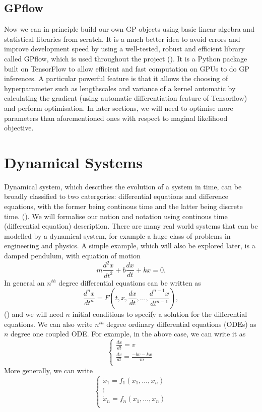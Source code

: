 \documentclass{statsmsc}
\begin{document}
\subsection{GPflow}
Now we can in principle build our own GP objects using basic linear algebra and statistical libraries from scratch. 
It is a much better idea to avoid errors and improve development speed by using a well-tested, robust and efficient library called GPflow, which is used throughout the project (\cite{GPflow2017}).
It is a Python package built on TensorFlow to allow efficient and fast computation on GPUs to do GP inferences.
A particular powerful feature is that it allows the choosing of hyperparameter such as lengthscales and variance of a kernel automatic by calculating the gradient (using automatic differentiation feature of Tensorflow) and perform optimisation.
In later sections, we will need to optimise more parameters than aforementioned ones with respect to maginal likelihood objective.


\section{Dynamical Systems}
Dynamical system, which describes the evolution of a system in time, can be broadly classified to two catergories: differential equations and difference equations, with the former being continous time and the latter being discrete time. (\cite{strogatz_2019}). 
We will formalise our notion and notation using continous time (differential equation) description.
There are many real world systems that can be modelled by a dynamical system, for example a huge class of problems in engineering and physics. 
A simple example, which will also be explored later, is a damped pendulum, with equation of motion
$$
m\frac{d^2x}{dt^2}+b\frac{dx}{dt}+kx=0.
$$
In general an $n^{th}$ degree differential equations can be written as 
$$
\frac{d^{n} x}{d t^{n}}=F\left(t, x, \frac{d x}{d t}, \ldots, \frac{d^{n-1} x}{d t^{n-1}}\right),
$$
(\cite{glendinning_1994}) and we will need $n$ initial conditions to specify a solution for the differential equations.
We can also write $n^{th}$ degree ordinary differential equations (ODEs) as $n$ degree one coupled ODE. 
For example, in the above case, we can write it as 
$$
\begin{cases}
  \frac{dx}{dt} = v\\
  \frac{dv}{dt} = \frac{-bv-kx}{m}\\
\end{cases}
$$
More generally, we can write 
$$
\begin{cases}
  \dot{x}_1=f_1(x_1, \dots, x_n)\\ 
  \vdots\\
  \dot{x}_n=f_n(x_1, \dots, x_n)\\ 
\end{cases}
$$
\end{document}
